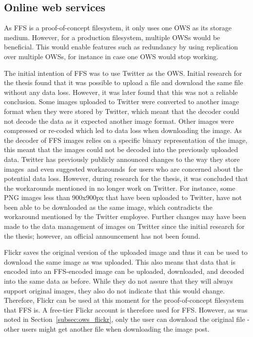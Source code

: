 \subsection{Online web services}
As \gls{FFS} is a \mbox{proof-of-concept} filesystem, it only uses one \gls{OWS} as its storage medium. However, for a production filesystem, multiple \gls{OWS}s would be beneficial. This would enable features such as redundancy by using replication over multiple \gls{OWS}s, for instance in case one \gls{OWS} would stop working.

The initial intention of \gls{FFS} was to use Twitter as the \gls{OWS}. Initial research for the thesis found that it was possible to upload a file and download the same file without any data loss. However, it was later found that this was not a reliable conclusion. Some images uploaded to Twitter were converted to another image format when they were stored by Twitter, which meant that the decoder could not decode the data as it expected another image format. Other images were compressed or \mbox{re-coded} which led to data loss when downloading the image. As the decoder of \gls{FFS} images relies on a specific binary representation of the image, this meant that the images could not be decoded into the previously uploaded data. Twitter has previously publicly announced changes to the way they store images\,\cite{nolanobrienUpcomingChangesPNG2018} and even suggested workarounds\,\cite{nolanobrienFeedbackUpcomingChanges2019} for users who are concerned about the potential data loss. However, during research for the thesis, it was concluded that the workarounds mentioned in \cite{nolanobrienFeedbackUpcomingChanges2019} no longer work on Twitter. For instance, some PNG images less than 900x900px that have been uploaded to Twitter, have not been able to be downloaded as the same image, which contradicts the workaround mentioned by the Twitter employee. Further changes may have been made to the data management of images on Twitter since the initial research for the thesis; however, an official announcement has not been found.

Flickr saves the original version of the uploaded image and thus it can be used to download the same image as was uploaded. This also means that data that is encoded into an \gls{FFS}-encoded image can be uploaded, downloaded, and decoded into the same data as before. While they do not assure that they will always support original images, they also do not indicate that this would change. Therefore, Flickr can be used at this moment for the \mbox{proof-of-concept} filesystem that \gls{FFS} is. A \mbox{free-tier} Flickr account is therefore used for \gls{FFS}. However, as was noted in Section~\ref{subsec:ows_flickr}, only the user can download the original file - other users might get another file when downloading the image post. 

